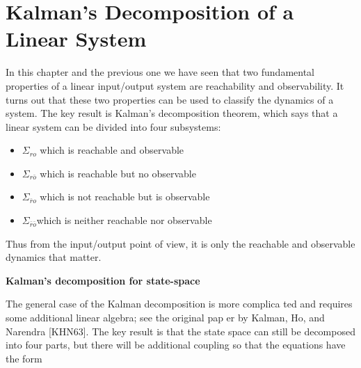 \section{Kalman’s Decomposition of a Linear System}

In this chapter and the previous one we have seen that two fundamental properties
of a linear input/output system are reachability and observability. It turns out that
these two properties can be used to classify the dynamics of a system. The key
result is Kalman’s decomposition theorem, which says that a linear system can be
divided into four subsystems:

\begin{itemize}
\item $\Sigma_{ro}$ which is reachable and observable
\item $\Sigma_{r\bar{o}}$ which is reachable but no observable 
\item $\Sigma_{\bar{r}o}$ which is not reachable but is observable
\item $\Sigma_{\bar{r}\bar{o}}$which is neither reachable nor observable
\end{itemize}


Thus from the input/output point of view, it is only the reachable and observable
dynamics that matter.


\begin{framed}
\theoremstyle{remark}
\begin{remark}{\textbf{Kalman's decomposition for state-space}}

The general case of the Kalman decomposition is more complica
ted and requires some additional linear algebra; see the original pap
er by Kalman, Ho, and Narendra [KHN63]. The key result is that the state space can still be decomposed
into four parts, but there will be additional coupling so that the equations have the form 
\end{remark}
\end{framed}


